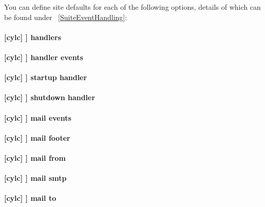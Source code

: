 You can define site defaults for each of the following options, details
of which can be found under ~\ref{SuiteEventHandling}:

\paragraph[handlers]{[cylc] \textrightarrow [[events]] \textrightarrow handlers}

\paragraph[handler events]{[cylc] \textrightarrow [[events]] \textrightarrow handler events}

\paragraph[startup handler]{[cylc] \textrightarrow [[events]] \textrightarrow startup handler}

\paragraph[shutdown handler]{[cylc] \textrightarrow [[events]] \textrightarrow shutdown handler}

\paragraph[mail events]{[cylc] \textrightarrow [[events]] \textrightarrow mail events}

\paragraph[mail footer]{[cylc] \textrightarrow [[events]] \textrightarrow mail footer}

\paragraph[mail from]{[cylc] \textrightarrow [[events]] \textrightarrow mail from}

\paragraph[mail smtp]{[cylc] \textrightarrow [[events]] \textrightarrow mail smtp}

\paragraph[mail to]{[cylc] \textrightarrow [[events]] \textrightarrow mail to}

